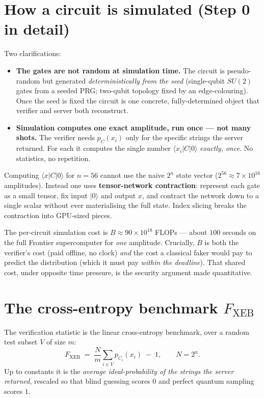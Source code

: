 \documentclass[11pt]{article}
\theoremstyle{definition}
\theoremstyle{plain}
\newcommand{\Fxeb}{F_{\mathrm{XEB}}}
\begin{document}
\section{How a circuit is simulated (Step 0 in detail)}
Two clarifications:
\begin{itemize}[leftmargin=1.6em,itemsep=2pt]
\item \textbf{The gates are not random at simulation time.} The circuit is pseudo-random
but generated \emph{deterministically from the seed} (single-qubit $SU(2)$ gates from a
seeded PRG; two-qubit topology fixed by an edge-colouring). Once the seed is fixed the
circuit is one concrete, fully-determined object that verifier and server both reconstruct.
\item \textbf{Simulation computes one exact amplitude, run once --- not many shots.} The
verifier needs $p_C(x_i)$ only for the specific strings the server returned. For each it
computes the single number $\langle x_i|C|0\rangle$ \emph{exactly, once}. No statistics, no
repetition.
\end{itemize}
Computing $\langle x|C|0\rangle$ for $n=56$ cannot use the naive $2^n$ state vector
($2^{56}\approx7\times10^{16}$ amplitudes). Instead one uses \textbf{tensor-network
contraction}: represent each gate as a small tensor, fix input $|0\rangle$ and output $x$,
and contract the network down to a single scalar without ever materialising the full state.
Index slicing breaks the contraction into GPU-sized pieces.

\begin{keybox}
The per-circuit simulation cost is $B\approx 90\times10^{18}$ FLOPs --- about $100$ seconds
on the full Frontier supercomputer for \emph{one} amplitude. Crucially, $B$ is both the
verifier's cost (paid offline, no clock) \emph{and} the cost a classical faker would pay to
predict the distribution (which it must pay \emph{within the deadline}). That shared cost,
under opposite time pressure, is the security argument made quantitative.
\end{keybox}

\section{The cross-entropy benchmark $\Fxeb$}
\label{sec:xebdef}
The verification statistic is the linear cross-entropy benchmark, over a random test subset
$V$ of size $m$:
\begin{equation}\label{eq:xebdef}
\Fxeb \;=\; \frac{N}{m}\sum_{i\in V} p_{C_i}(x_i)\;-\;1, \qquad N=2^n .
\end{equation}
Up to constants it is the \emph{average ideal-probability of the strings the server
returned}, rescaled so that blind guessing scores $0$ and perfect quantum sampling scores
$1$.
\end{document}
